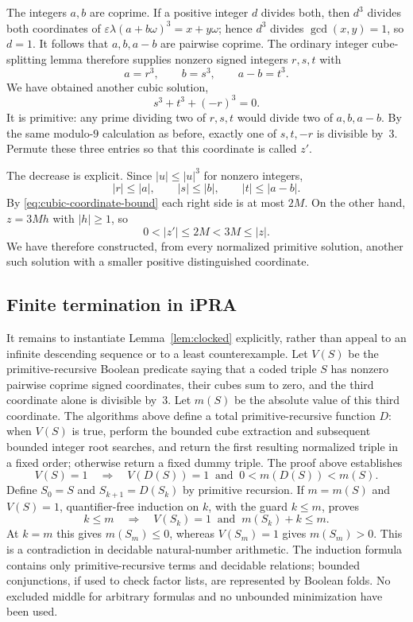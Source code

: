 The integers $a,b$ are coprime.  If a positive integer $d$ divides both,
then $d^3$ divides both coordinates of
$\varepsilon\lambda(a+b\omega)^3=x+y\omega$; hence $d^3$ divides
$\gcd(x,y)=1$, so $d=1$.  It follows that $a,b,a-b$ are pairwise
coprime.  The ordinary integer cube-splitting lemma therefore supplies
nonzero signed integers $r,s,t$ with
\[
 a=r^3,\qquad b=s^3,\qquad a-b=t^3.
\]
We have obtained another cubic solution,
\[
 s^3+t^3+(-r)^3=0.
\]
It is primitive: any prime dividing two of $r,s,t$ would divide two of
$a,b,a-b$.  By the same modulo-$9$ calculation as before, exactly one
of $s,t,-r$ is divisible by~$3$.  Permute these three entries so that
this coordinate is called $z'$.

The decrease is explicit.  Since $|u|\le|u|^3$ for nonzero integers,
\[
 |r|\le|a|,\qquad |s|\le|b|,\qquad |t|\le|a-b|.
\]
By \eqref{eq:cubic-coordinate-bound} each right side is at most $2M$.
On the other hand, $z=3Mh$ with $|h|\ge1$, so
\begin{equation}
 0<|z'|\le2M<3M\le|z|.
 \label{eq:cubic-descent}
\end{equation}
We have therefore constructed, from every normalized primitive
solution, another such solution with a smaller positive distinguished
coordinate.

\subsection{Finite termination in iPRA}

It remains to instantiate Lemma~\ref{lem:clocked} explicitly, rather
than appeal to an infinite descending sequence or to a least
counterexample.  Let $V(S)$ be the
primitive-recursive Boolean predicate saying that a coded triple $S$
has nonzero pairwise coprime signed coordinates, their cubes sum to
zero, and the third coordinate alone is divisible by~$3$.  Let
$m(S)$ be the absolute value of this third coordinate.  The algorithms
above define a total primitive-recursive function $D$: when $V(S)$ is
true, perform the bounded cube extraction and subsequent bounded
integer root searches, and return the first resulting normalized
triple in a fixed order; otherwise return a fixed dummy triple.  The
proof above establishes
\[
 V(S)=1\quad\Longrightarrow\quad
 V(D(S))=1\ \text{ and }\ 0<m(D(S))<m(S).
\]
Define $S_0=S$ and $S_{k+1}=D(S_k)$ by primitive recursion.  If
$m=m(S)$ and $V(S)=1$, quantifier-free induction on $k$, with the
guard $k\le m$, proves
\[
 k\le m\quad\Longrightarrow\quad V(S_k)=1\ \text{ and }\ m(S_k)+k\le m.
\]
At $k=m$ this gives $m(S_m)\le0$, whereas $V(S_m)=1$ gives
$m(S_m)>0$.  This is a contradiction in decidable natural-number
arithmetic.  The induction formula contains only primitive-recursive
terms and decidable relations; bounded conjunctions, if used to check
factor lists, are represented by Boolean folds.  No excluded middle
for arbitrary formulas and no unbounded minimization have been used.

